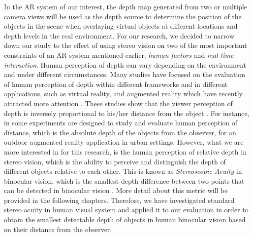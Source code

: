 \documentclass[12pt]{report}
\begin{document}
In the AR system of our interest, the depth map generated from two or multiple camera views will be used as the depth source to determine the position of the objects in the scene when
overlaying virtual objects at different locations and depth levels in the real environment. For our research, we decided to narrow down our study to the effect of using stereo vision
on two of the most important constraints of an AR system mentioned earlier; {\it human factors} and {\it real-time interaction}. {\newline}
Human perception of depth can vary depending on the environment and under different circumstances. Many studies have focused on the evaluation of human perception of depth within different frameworks
and in different applications, such as virtual reality, and augmented reality which have recently attracted more attention \cite{wann95,dras96,liv05,jer05,swa07,kru10}.
These studies show that the viewer perception of depth
is inversely proportional to his/her distance from the object \cite{kru10,swa07,jer05,liv05}. For instance, in \cite{swa07} some experiments are designed to study and evaluate human
perception of distance, which is the absolute depth of the objects from the observer, for an outdoor augmented reality application in urban settings. 
However, what we are more interested in for this research, is the human perception of relative depth in stereo vision, which is the ability to perceive and distinguish 
the depth of different objects relative to each other. This is known as {\it Stereoscopic Acuity} in binocular vision, which is the smallest depth difference between two points 
that can be detected in binocular vision \cite{pfa2000}. More detail about
this metric will be provided in the following chapters.
Therefore, we have investigated standard stereo acuity in human visual system and applied it to our evaluation in order to obtain the smallest detectable depth of 
objects in human binocular vision based on their distance from the observer.
\end{document}
